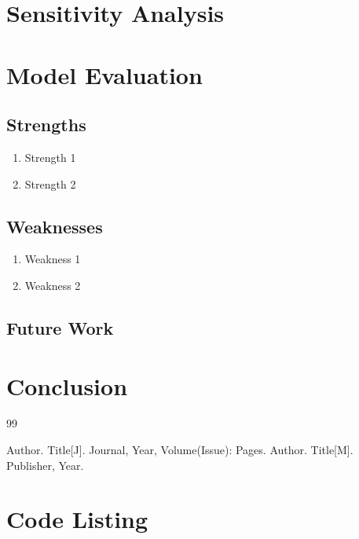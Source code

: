 \documentclass[12pt]{article}
\begin{document}
\section{Sensitivity Analysis}

\section{Model Evaluation}

\subsection{Strengths}
\begin{enumerate}
    \item Strength 1
    \item Strength 2
\end{enumerate}

\subsection{Weaknesses}
\begin{enumerate}
    \item Weakness 1
    \item Weakness 2
\end{enumerate}

\subsection{Future Work}

\section{Conclusion}

\begin{thebibliography}{99}

 Author. Title[J]. Journal, Year, Volume(Issue): Pages.
 Author. Title[M]. Publisher, Year.

\end{thebibliography}

\appendix
\section{Code Listing}
\end{document}
